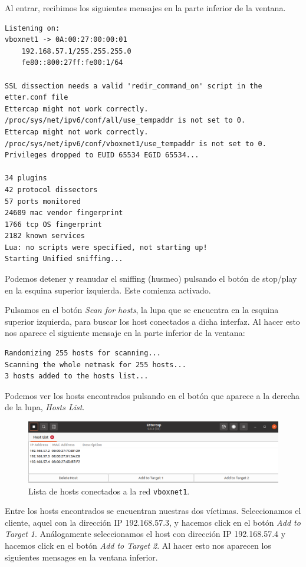 \documentclass[11pt]{article}
\begin{document}
Al entrar, recibimos los siguientes mensajes en la parte inferior de la ventana.

\begin{Verbatim}[tabsize=4]
Listening on:
vboxnet1 -> 0A:00:27:00:00:01
	192.168.57.1/255.255.255.0
	fe80::800:27ff:fe00:1/64

SSL dissection needs a valid 'redir_command_on' script in the etter.conf file
Ettercap might not work correctly. /proc/sys/net/ipv6/conf/all/use_tempaddr is not set to 0.
Ettercap might not work correctly. /proc/sys/net/ipv6/conf/vboxnet1/use_tempaddr is not set to 0.
Privileges dropped to EUID 65534 EGID 65534...

34 plugins
42 protocol dissectors
57 ports monitored
24609 mac vendor fingerprint
1766 tcp OS fingerprint
2182 known services
Lua: no scripts were specified, not starting up!
Starting Unified sniffing...
\end{Verbatim}

Podemos detener y reanudar el sniffing (husmeo) pulsando el botón de stop/play en la esquina
 superior izquierda. Este comienza activado.
 
Pulsamos en el botón \textit{Scan for hosts}, la lupa que se encuentra en la esquina superior izquierda, para buscar los host conectados a dicha interfaz. Al hacer esto nos aparece el siguiente mensaje en la parte inferior de la ventana:

\begin{Verbatim}[tabsize=4]
Randomizing 255 hosts for scanning...
Scanning the whole netmask for 255 hosts...
3 hosts added to the hosts list...
\end{Verbatim}

Podemos ver los hosts encontrados pulsando en el botón que aparece a la derecha de la lupa, \textit{Hosts List}.

\begin{figure}[H]
	\centering
	\includegraphics[width=140mm]{images/host-list}
	\caption{Lista de hosts conectados a la red \texttt{vboxnet1}.}
	\label{fig:host-list}
\end{figure}


Entre los hosts encontrados se encuentran nuestras dos víctimas. Seleccionamos el cliente, aquel con la dirección IP 192.168.57.3, y hacemos click en el botón \textit{Add to Target 1}. Análogamente seleccionamos el host con dirección IP 192.168.57.4 y hacemos click en el botón \textit{Add to Target 2}. Al hacer esto nos aparecen los siguientes mensages en la ventana inferior.
\end{document}
